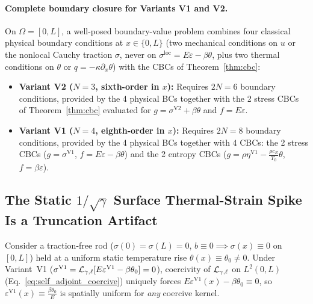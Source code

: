 \paragraph{Complete boundary closure for Variants V1 and V2.}
On $\Omega = [0,L]$, a well-posed boundary-value problem combines four classical physical boundary conditions at $x \in \{0,L\}$ (two mechanical conditions on $u$ or the nonlocal Cauchy traction $\sigma$, never on $\sigma^{\mathrm{loc}} = E\varepsilon - \beta\theta$, plus two thermal conditions on $\theta$ or $q = -\kappa\partial_x\theta$) with the CBCs of Theorem~\ref{thm:cbc}:
\begin{itemize}[leftmargin=*]
  \item \textbf{Variant V2 ($N=3$, sixth-order in $x$):} Requires $2N = 6$ boundary conditions, provided by the 4 physical BCs together with the 2 stress CBCs of Theorem~\ref{thm:cbc} evaluated for $g = \sigma^{\mathrm{V2}} + \beta\theta$ and $f = E\varepsilon$.
  \item \textbf{Variant V1 ($N=4$, eighth-order in $x$):} Requires $2N = 8$ boundary conditions, provided by the 4 physical BCs together with 4 CBCs: the 2 stress CBCs ($g = \sigma^{\mathrm{V1}}$, $f = E\varepsilon - \beta\theta$) and the 2 entropy CBCs ($g = \rho\eta^{\mathrm{V1}} - \frac{\rho c_E}{T_0}\theta$, $f = \beta\varepsilon$).
\end{itemize}

\subsection{The Static $1/\sqrt{\gamma}$ Surface Thermal-Strain Spike Is a Truncation Artifact}\label{subsec:truncation_artifact}

Consider a traction-free rod ($\sigma(0) = \sigma(L) = 0$, $b \equiv 0 \implies \sigma(x) \equiv 0$ on $[0,L]$) held at a uniform static temperature rise $\theta(x) \equiv \theta_0 \neq 0$. Under Variant~V1 ($\sigma^{\mathrm{V1}} = \mathcal{L}_{\gamma,\ell}[E\varepsilon^{\mathrm{V1}} - \beta\theta_0] = 0$), coercivity of $\mathcal{L}_{\gamma,\ell}$ on $L^2(0,L)$ (Eq.~\eqref{eq:self_adjoint_coercive}) uniquely forces $E\varepsilon^{\mathrm{V1}}(x) - \beta\theta_0 \equiv 0$, so $\varepsilon^{\mathrm{V1}}(x) \equiv \frac{\beta\theta_0}{E}$ is spatially uniform for \emph{any} coercive kernel.

